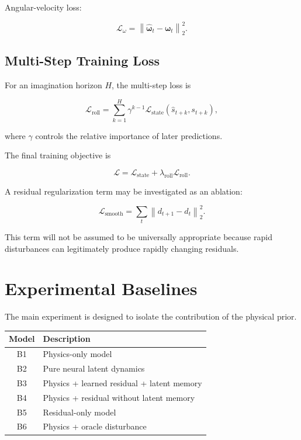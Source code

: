 \documentclass[conference]{IEEEtran}
\begin{document}
Angular-velocity loss:

\begin{equation}
\mathcal{L}_\omega
=
\left\|
\hat{\boldsymbol{\omega}}_t
-
\boldsymbol{\omega}_t
\right\|_2^2.
\end{equation}


\subsection{Multi-Step Training Loss}

For an imagination horizon $H$, the multi-step loss is

\begin{equation}
\mathcal{L}_{\mathrm{roll}}
=
\sum_{k=1}^{H}
\gamma^{k-1}
\mathcal{L}_{\mathrm{state}}
(\hat{s}_{t+k},s_{t+k}),
\end{equation}

where $\gamma$ controls the relative importance of later predictions.

The final training objective is

\begin{equation}
\mathcal{L}
=
\mathcal{L}_{\mathrm{state}}
+
\lambda_{\mathrm{roll}}
\mathcal{L}_{\mathrm{roll}}.
\end{equation}

A residual regularization term may be investigated as an ablation:

\begin{equation}
\mathcal{L}_{\mathrm{smooth}}
=
\sum_t
\left\|
d_{t+1}-d_t
\right\|_2^2.
\end{equation}

This term will not be assumed to be universally appropriate because
rapid disturbances can legitimately produce rapidly changing
residuals.


\section{Experimental Baselines}


The main experiment is designed to isolate the contribution of the
physical prior.

\begin{center}
\renewcommand{\arraystretch}{1.2}
\begin{tabular}{c l}
\toprule
\textbf{Model} & \textbf{Description} \\
\midrule
B1 & Physics-only model \\
B2 & Pure neural latent dynamics \\
B3 & Physics + learned residual + latent memory \\
B4 & Physics + residual without latent memory \\
B5 & Residual-only model \\
B6 & Physics + oracle disturbance \\
\bottomrule
\end{tabular}
\end{center}
\end{document}
